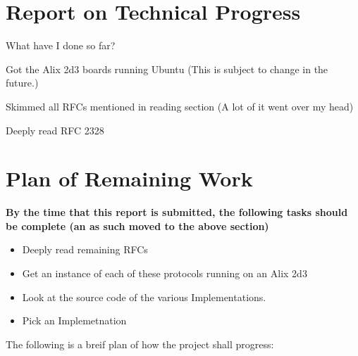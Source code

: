 \documentclass[12pt]{report}
\begin{document}
\chapter{Report on Technical Progress}
What have I done so far?

Got the Alix 2d3 boards running Ubuntu 
(This is subject to change in the future.)

Skimmed all RFCs mentioned in reading section 
(A lot of it went over my head)

Deeply read RFC 2328

\chapter{Plan of Remaining Work}

\em

\textbf{By the time that this report is submitted, the following tasks should be complete (an as such moved to the above section)}

\begin{itemize}

\item Deeply read remaining RFCs
\item Get an instance of each of these protocols running on an Alix 2d3
\item Look at the source code of the various Implementations. 
\item Pick an Implemetnation 

\end{itemize}

\em 

The following is a breif plan of how the project shall progress:
\end{document}
